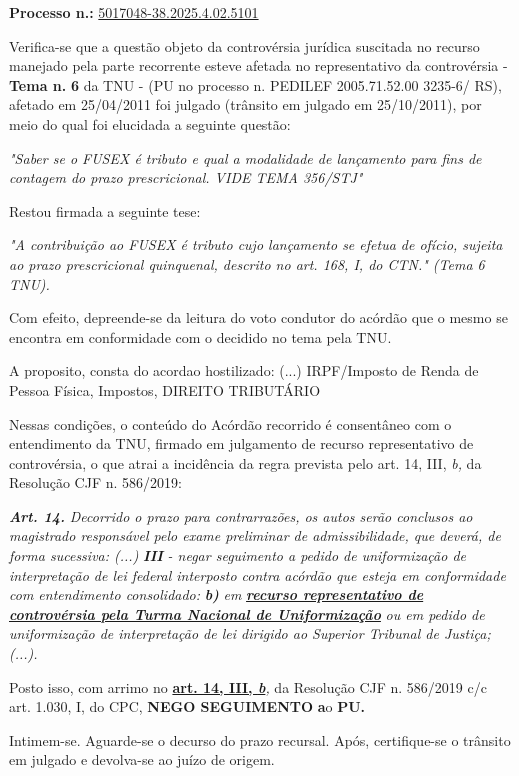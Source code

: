\documentclass[12pt]{article}
\begin{document}
\justifying
\noindent \textbf{Processo n.: }\uline{5017048-38.2025.4.02.5101}

\noindent Verifica-se que a questão objeto da controvérsia jurídica suscitada no recurso manejado pela parte recorrente esteve afetada no representativo da controvérsia - \textbf{Tema n. }\textbf{6} da TNU - (PU no processo n. PEDILEF 2005.71.52.00 3235-6/ RS),  afetado em 25/04/2011 foi julgado (trânsito em julgado em 25/10/2011), por meio do qual foi elucidada a seguinte questão:

{\leftskip=3.1cm\rightskip=0.8cm\parindent=0pt \textit{"Saber se o FUSEX é tributo e qual a modalidade de lançamento para fins de contagem do prazo prescricional. VIDE TEMA 356/STJ"}\par}

\noindent Restou firmada a seguinte tese:

{\leftskip=3.1cm\rightskip=0.8cm\parindent=0pt \textit{"A contribuição ao FUSEX é tributo cujo lançamento se efetua de ofício, sujeita ao prazo prescricional quinquenal, descrito no art. 168, I, do CTN." (Tema 6 TNU).}\par}

\noindent Com efeito, depreende-se da leitura do voto condutor do acórdão que o mesmo se encontra em conformidade com o decidido no  tema pela TNU.

\noindent A proposito, consta do acordao hostilizado: (...) IRPF/Imposto de Renda de Pessoa Física, Impostos, DIREITO TRIBUTÁRIO

\noindent Nessas condições, o conteúdo do Acórdão recorrido é consentâneo com o entendimento da TNU, firmado em julgamento de recurso representativo de controvérsia, o que atrai a incidência da regra prevista pelo art. 14, III, \textit{b,} da Resolução CJF n. 586/2019:

\noindent \textit{\textbf{Art. 14.}}\textit{ Decorrido o prazo para contrarrazões, os autos serão conclusos ao magistrado responsável pelo exame preliminar de admissibilidade, que deverá, de forma sucessiva: (...) }\textit{\textbf{III }}\textit{- negar seguimento a pedido de uniformização de interpretação de lei federal interposto contra acórdão que esteja em conformidade com entendimento consolidado: }\textit{\textbf{b)}}\textit{ em }\textit{\textbf{\uline{recurso representativo de controvérsia pela Turma Nacional de Uniformização}}}\textit{ ou em pedido de uniformização de interpretação de lei dirigido ao Superior Tribunal de Justiça;(...).}

\noindent Posto isso, com arrimo no \textbf{\uline{art. 14, III, }}\textit{\textbf{\uline{b}}}\textit{,} da Resolução CJF n. 586/2019 c/c art. 1.030, I, do CPC, \textbf{NEGO SEGUIMENTO }\textbf{a}o\textbf{ PU}\textbf{.}

\noindent Intimem-se. Aguarde-se o decurso do prazo recursal. Após, certifique-se o trânsito em julgado e devolva-se ao juízo de origem.
\end{document}

